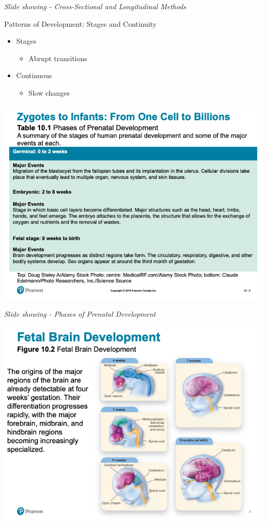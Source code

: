 \documentclass[
]{book}
\providecommand{\tightlist}{%
  \setlength{\itemsep}{0pt}\setlength{\parskip}{0pt}}
\begin{document}
\emph{Slide showing - Cross-Sectional and Longitudinal Methods}

Patterns of Development: Stages and Continuity

\begin{itemize}
\tightlist
\item
  Stages

  \begin{itemize}
  \tightlist
  \item
    Abrupt transitions
  \end{itemize}
\item
  Continuous

  \begin{itemize}
  \tightlist
  \item
    Slow changes
  \end{itemize}
\end{itemize}

\includegraphics{assets/unit_3/slide_9.png}

\emph{Slide showing - Phases of Prenatal Development}

\includegraphics{assets/unit_3/slide_10.png}
\end{document}
